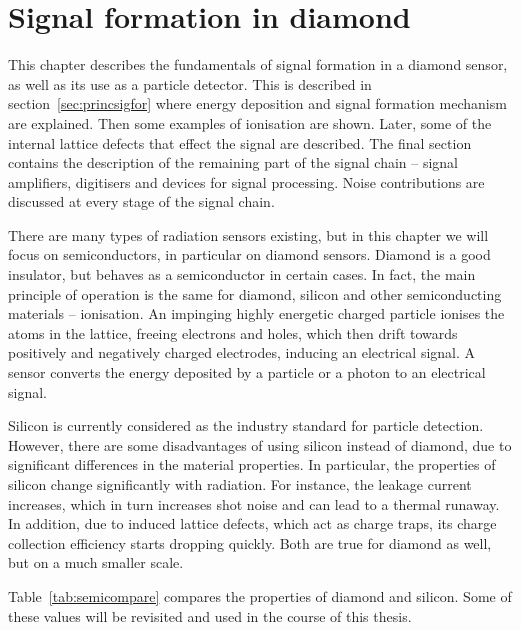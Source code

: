 \documentclass[twoside,12pt]{packages/mytustyle}  %
\begin{document}
\baselineskip=15pt
\newcommand{\ga}{\greektext a\latintext}
\newcommand{\gmu}{\greektext m\latintext}

\chapter{Signal formation in diamond}

This chapter describes the fundamentals of signal formation in a diamond sensor, as well as its use as a particle detector. This is described in section~\ref{sec:princsigfor} where energy deposition and signal formation mechanism are explained. Then some examples of ionisation are shown. Later, some of the internal lattice defects that effect the signal are described. The final section contains the description of the remaining part of the signal chain -- signal amplifiers, digitisers and devices for signal processing. Noise contributions are discussed at every stage of the signal chain.

There are many types of radiation sensors existing, but in this chapter we will focus on semiconductors, in particular on diamond sensors. Diamond is a good insulator, but behaves as a semiconductor in certain cases.  In fact, the main principle of operation is the same for diamond, silicon and other semiconducting materials -- ionisation.  An impinging highly energetic charged particle ionises the atoms in the lattice, freeing electrons and holes, which then drift towards positively and negatively charged electrodes, inducing an electrical signal. A sensor converts the energy deposited by a particle or a photon to an electrical signal.

Silicon is currently considered as the industry standard for particle detection. However, there are some disadvantages of using silicon instead of diamond, due to significant differences in the material properties. In particular, the properties of silicon change significantly with radiation. For instance, the leakage current increases, which in turn increases shot noise and can lead to a thermal runaway. In addition, due to induced lattice defects, which act as charge traps, its charge collection efficiency starts dropping quickly. Both are true for diamond as well, but on a much smaller scale.

Table~\ref{tab:semicompare} compares the properties of diamond and silicon. Some of these values will be revisited and used in the course of this thesis.
\end{document}
